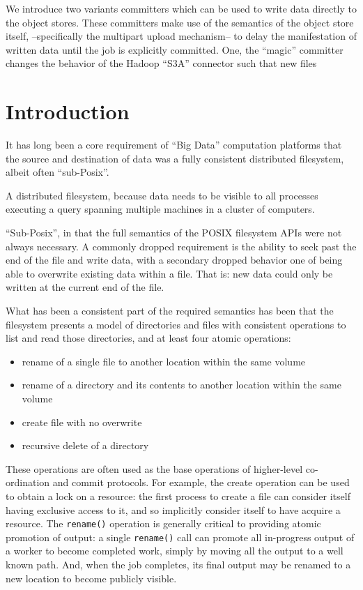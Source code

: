 \documentclass[9pt,technote]{IEEEtran}
\begin{document}
We introduce two variants committers which can be used to write data directly to the object stores. These committers make use of the semantics of the object store itself, --specifically the multipart upload mechanism-- to delay the manifestation of written data until the job is explicitly committed. One, the ``magic'' committer changes the behavior of the Hadoop ``S3A'' connector such that new files

\section{Introduction}


It has long been a core requirement of ``Big Data'' computation platforms that the source and destination of data was a fully consistent distributed filesystem, albeit often ``sub-Posix''.


A distributed filesystem, because data needs to be visible to all processes executing a query spanning multiple machines in a cluster of computers. 

``Sub-Posix'', in that the full semantics of the POSIX filesystem APIs were not always necessary. A commonly dropped requirement is the ability to seek past the end of the file and write data, with a secondary dropped behavior one of being able to overwrite existing data within a file. That is: new data could only be written at the current end of the file. 

What has been a consistent part of the required semantics has been that the filesystem presents a model of directories and files with consistent operations to list and read those directories, and at least four atomic operations: 
\begin{itemize}
  \item{rename of a single file to another location within the same volume}
  \item{rename of a directory and its contents to another location within the same volume}
  \item{create file with no overwrite}
  \item{recursive delete of a directory}
\end{itemize}

These operations are often used as the base operations of higher-level co-ordination and commit protocols. For example, the create operation can be used to obtain a lock on a resource: the first process to create a file can consider itself having exclusive access to it, and so implicitly consider itself to have acquire a resource. The \texttt{rename()} operation is generally critical to providing atomic promotion of output: a single \texttt{rename()} call can promote all in-progress output of a worker to become completed work, simply by moving all the output to a well known path. And, when the job completes, its final output may be renamed to a new location to become publicly visible.
\end{document}
